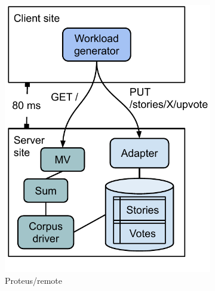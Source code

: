 \begin{figure}[H]
\begin{subfigure}[b]{0.24\textwidth}
            \includegraphics[width=\textwidth]{./figures/evaluation/evaluation_deployments_proteus_remote.pdf}
            \caption{Proteus/remote}
            \label{fig:deployments_proteus_remote}
        \end{subfigure}
        \hfill
        \begin{subfigure}[b]{0.24\textwidth}
            \centering

\end{subfigure}
\end{figure}
